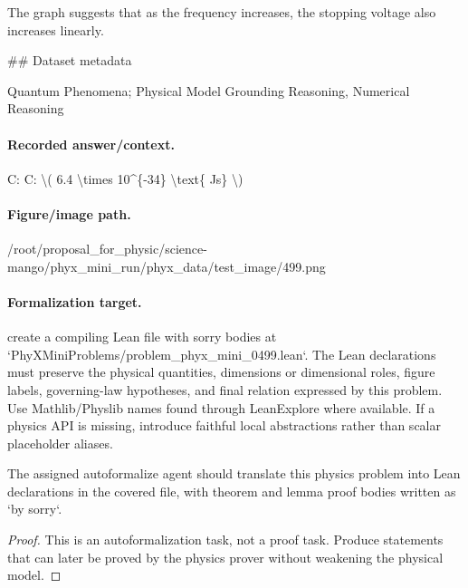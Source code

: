 The graph suggests that as the frequency increases, the stopping voltage also increases linearly.

\#\# Dataset metadata

Quantum Phenomena; Physical Model Grounding Reasoning, Numerical Reasoning

\paragraph{Recorded answer/context.}
C: C: \textbackslash{}( 6.4 \textbackslash{}times 10\textasciicircum{}\{-34\} \textbackslash{}text\{ Js\} \textbackslash{})

\paragraph{Figure/image path.}
/root/proposal\_for\_physic/science-mango/phyx\_mini\_run/phyx\_data/test\_image/499.png

\paragraph{Formalization target.}
create a compiling Lean file with sorry bodies at `PhyXMiniProblems/problem\_phyx\_mini\_0499.lean`. The Lean declarations must preserve the physical quantities, dimensions or dimensional roles, figure labels, governing-law hypotheses, and final relation expressed by this problem.
Use Mathlib/Physlib names found through LeanExplore where available. If a physics API is missing, introduce faithful local abstractions rather than scalar placeholder aliases.

\begin{theorem}
\label{thm:physics:phyx_mini_0499:target}
The assigned autoformalize agent should translate this physics problem into Lean declarations in the covered file, with theorem and lemma proof bodies written as `by sorry`.
\end{theorem}
\begin{proof}
This is an autoformalization task, not a proof task. Produce statements that can later be proved by the physics prover without weakening the physical model.
\end{proof}

